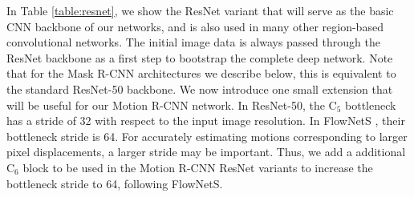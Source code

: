 In Table \ref{table:resnet}, we show the ResNet variant
that will serve as the basic CNN backbone of our networks, and
is also used in many other region-based convolutional networks.
The initial image data is always passed through the ResNet backbone as a first step to
bootstrap the complete deep network.
Note that for the Mask R-CNN architectures we describe below, this is equivalent
to the standard ResNet-50 backbone. We now introduce one small extension that
will be useful for our Motion R-CNN network.
In ResNet-50, the C$_5$ bottleneck has a stride of 32 with respect to the
input image resolution. In FlowNetS \cite{FlowNet}, their bottleneck stride is 64.
For accurately estimating motions corresponding to larger pixel displacements, a larger
stride may be important.
Thus, we add a additional C$_6$ block to be used in the Motion R-CNN ResNet variants
to increase the bottleneck stride to 64, following FlowNetS.


